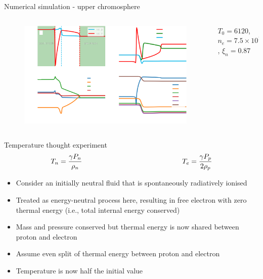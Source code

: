 \documentclass[10pt,aspectratio=169,usenames,dvipsnames]{beamer}
\begin{document}
\begin{frame}{Numerical simulation - upper chromosphere}
\begin{columns}
\begin{column}{0.8\textwidth}
\begin{figure}
    \includegraphics[width=0.95\linewidth]{2023StAndrewsAstro/Figures/shocksub2_plot_upc_corrected.png}
    \label{fig:upperchromocontext}
\end{figure}
\end{column}
\begin{column}{0.2\textwidth}
    $T_0=6120$, $n_e=7.5\times 10^{16}$, $\xi_n=0.87$
\end{column}
\end{columns}
\end{frame}

\begin{frame}{Temperature thought experiment}
\begin{gather}
    T_n=\frac{\gamma P_n}{\rho_n} \mbox{\hspace{5cm}}
    T_e=\frac{\gamma P_p}{2 \rho_p} \nonumber
\end{gather}
\begin{itemize}
    \item Consider an initially neutral fluid that is spontaneously radiatively ionised
    \item Treated as energy-neutral process here, resulting in free electron with zero thermal energy (i.e., total internal energy conserved)
    \item Mass and pressure conserved but thermal energy is now shared between proton and electron
    \item Assume even split of thermal energy between proton and electron
    \item Temperature is now half the initial value
\end{itemize}
\end{frame}
\end{document}
